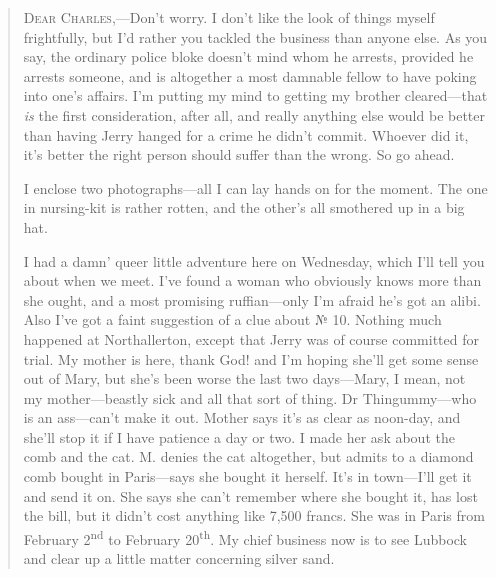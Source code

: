 \begin{quotation}

\textsc{Dear Charles},---Don't worry. I don't like the look of things myself frightfully, but I'd rather you tackled the business than anyone else. As you say, the ordinary police bloke doesn't mind whom he arrests, provided he arrests someone, and is altogether a most damnable fellow to have poking into one's affairs. I'm putting my mind to getting my brother cleared\allowbreak---\allowbreak that \textit{is} the first consideration, after all, and really anything else would be better than having Jerry hanged for a crime he didn't commit. Whoever did it, it's better the right person should suffer than the wrong. So go ahead.

I enclose two photographs\allowbreak---\allowbreak all I can lay hands on for the moment. The one in nursing-kit is rather rotten, and the other's all smothered up in a big hat.

I had a damn' queer little adventure here on Wednesday, which I'll tell you about when we meet. I've found a woman who obviously knows more than she ought, and a most promising ruffian\allowbreak---\allowbreak only I'm afraid he's got an alibi. Also I've got a faint suggestion of a clue about № 10. Nothing much happened at Northallerton, except that Jerry was of course committed for trial. My mother is here, thank God! and I'm hoping she'll get some sense out of Mary, but she's been worse the last two days\allowbreak---\allowbreak Mary, I mean, not my mother\allowbreak---\allowbreak beastly sick and all that sort of thing. Dr Thingummy\allowbreak---\allowbreak who is an ass\allowbreak---\allowbreak can't make it out. Mother says it's as clear as noon-day, and she'll stop it if I have patience a day or two. I made her ask about the comb and the cat. M. denies the cat altogether, but admits to a diamond comb bought in Paris\allowbreak---\allowbreak says she bought it herself. It's in town\allowbreak---\allowbreak I'll get it and send it on. She says she can't remember where she bought it, has lost the bill, but it didn't cost anything like 7,500 francs. She was in Paris from February 2\textsuperscript{nd} to February 20\textsuperscript{th}. My chief business now is to see Lubbock and clear up a little matter concerning silver sand.


\end{quotation}
